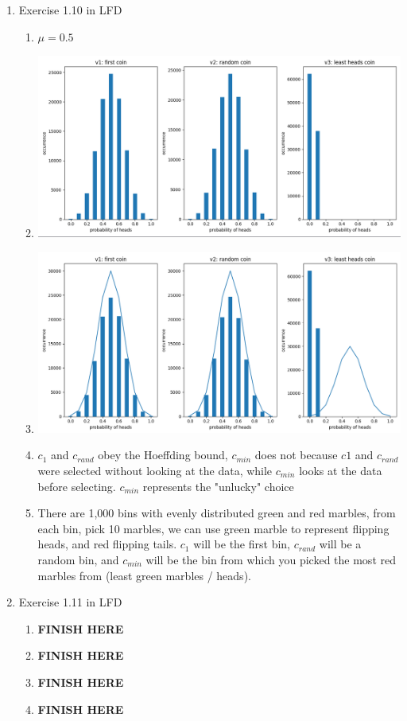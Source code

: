\documentclass{article}
\begin{document}
\begin{enumerate}
        \item Exercise 1.10 in LFD
        \begin{enumerate}[label=(\alph*)]
            \item $\mu = 0.5$
            \item \includegraphics[scale=0.35]{images/1.10b.png}
            \item \includegraphics[scale=0.35]{images/1.10c.png}
            \item $c_1$ and $c_{rand}$ obey the Hoeffding bound, $c_{min}$ does not because $c1$ and $c_{rand}$ were selected without looking at the data, while $c_{min}$ looks at the data before selecting. $c_{min}$ represents the "unlucky" choice
            \item There are 1,000 bins with evenly distributed green and red marbles, from each bin, pick 10 marbles, we can use green marble to represent flipping heads, and red flipping tails. $c_1$ will be the first bin, $c_{rand}$ will be a random bin, and $c_{min}$ will be the bin from which you picked the most red marbles from (least green marbles / heads).
        \end{enumerate}

        \item Exercise 1.11 in LFD
        \begin{enumerate}[label=(\alph*)]
            \item \textbf{FINISH HERE}
            \item \textbf{FINISH HERE}
            \item \textbf{FINISH HERE}
            \item \textbf{FINISH HERE}
        \end{enumerate}


\end{enumerate}
\end{document}

